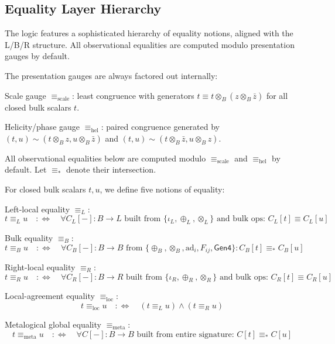 \subsection{Equality Layer Hierarchy}

The logic features a sophisticated hierarchy of equality notions, aligned with the L/B/R structure. All observational equalities are computed modulo presentation gauges by default.

\begin{definition}
\label{def:presentation-gauges}
The presentation gauges are always factored out internally:

Scale gauge $\equiv_{\text{scale}}$: least congruence with generators $t \equiv t \otimes_B (z \otimes_B \bar{z})$ for all closed bulk scalars $t$.

Helicity/phase gauge $\equiv_{\text{hel}}$: paired congruence generated by $(t,u) \sim (t \otimes_B z, u \otimes_B \bar{z})$ and $(t,u) \sim (t \otimes_B \bar{z}, u \otimes_B z)$.

All observational equalities below are computed modulo $\equiv_{\text{scale}}$ and $\equiv_{\text{hel}}$ by default. Let $\equiv_*$ denote their intersection.
\end{definition}

\begin{definition}
\label{def:observational-equalities}
For closed bulk scalars $t, u$, we define five notions of equality:

Left-local equality $\equiv_L$:
\[
t \equiv_L u \quad :\Leftrightarrow \quad \forall C_L[-]: B \to L \text{ built from } \{\iota_L, \oplus_L, \otimes_L\} \text{ and bulk ops: } C_L[t] \equiv C_L[u]
\]

Bulk equality $\equiv_B$:
\[
t \equiv_B u \quad :\Leftrightarrow \quad \forall C_B[-]: B \to B \text{ from } \{\oplus_B, \otimes_B, \text{ad}_i, F_{ij}, \mathsf{Gen4}\}: C_B[t] \equiv_* C_B[u]
\]

Right-local equality $\equiv_R$:
\[
t \equiv_R u \quad :\Leftrightarrow \quad \forall C_R[-]: B \to R \text{ built from } \{\iota_R, \oplus_R, \otimes_R\} \text{ and bulk ops: } C_R[t] \equiv C_R[u]
\]

Local-agreement equality $\equiv_{\text{loc}}$:
\[
t \equiv_{\text{loc}} u \quad :\Leftrightarrow \quad (t \equiv_L u) \land (t \equiv_R u)
\]

Metalogical global equality $\equiv_{\text{meta}}$:
\[
t \equiv_{\text{meta}} u \quad :\Leftrightarrow \quad \forall C[-]: B \to B \text{ built from entire signature: } C[t] \equiv_* C[u]
\]
\end{definition}

